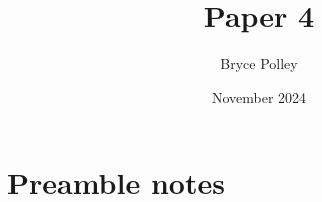 \documentclass{article}
\title{Paper 4}
\author{Bryce Polley}
\date{November 2024}
\begin{document}
\maketitle

\section{Preamble notes}








\end{document}
